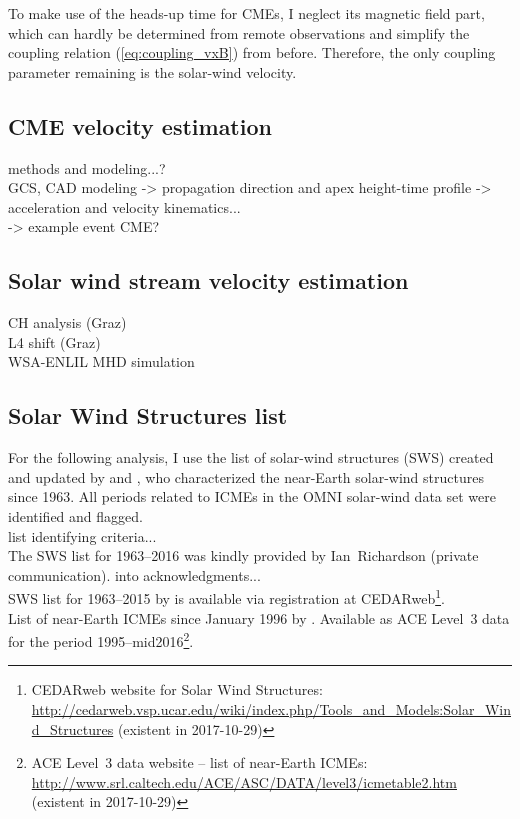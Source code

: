 To make use of the heads-up time for CMEs, I neglect its magnetic field part, which can hardly be determined from remote observations and simplify the coupling relation (\ref{eq:coupling_vxB}) from before. Therefore, the only coupling parameter remaining is the solar-wind velocity.

\subsection{CME velocity estimation}
methods and modeling...?\\
GCS, CAD modeling -> propagation direction and apex height-time profile -> acceleration and velocity kinematics...\\
-> example event CME?\\

\subsection{Solar wind stream velocity estimation}
CH analysis (Graz)\\
L4 shift (Graz)\\
WSA-ENLIL MHD simulation\\

\subsection{Solar Wind Structures list}
For the following analysis, I use the list of solar-wind structures (SWS) created and updated by \citet{Richardson2000} and \citet{Richardson2012}, who characterized the near-Earth solar-wind structures since 1963. All periods related to ICMEs in the OMNI solar-wind data set were identified and flagged.\\

list identifying criteria...\\

The SWS list for 1963--2016 was kindly provided by Ian~Richardson (private communication). into acknowledgments...\\

SWS list for 1963--2015 by \citep{Richardson2000,Richardson2012} is available via registration at CEDARweb\footnote{CEDARweb website for Solar Wind Structures: \url{http://cedarweb.vsp.ucar.edu/wiki/index.php/Tools_and_Models:Solar_Wind_Structures} (existent in 2017-10-29)}.\\
List of near-Earth ICMEs since January 1996 by \citet{Cane2003,Richardson2010}. Available as ACE Level~3 data for the period 1995--mid2016\footnote{ACE Level~3 data website -- list of near-Earth ICMEs: \url{http://www.srl.caltech.edu/ACE/ASC/DATA/level3/icmetable2.htm} (existent in 2017-10-29)}.\\

